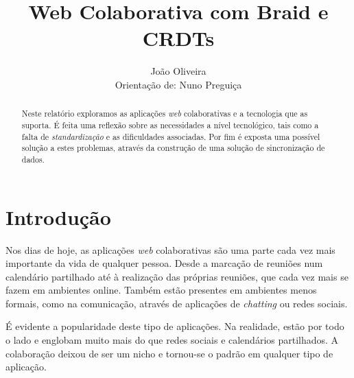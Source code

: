 \documentclass[runningheads]{llncs}
\begin{document}
%
    \title{Web Colaborativa com Braid e CRDTs} 
    \author{João Oliveira\\Orientação de: Nuno Preguiça}
    \maketitle              %
    \begin{abstract}
        Neste relatório exploramos as aplicações {\itshape web} colaborativas e
        a tecnologia que as suporta. É feita uma reflexão sobre as necessidades
        a nível tecnológico, tais como a falta de {\itshape standardização} e as
        dificuldades associadas. Por fim é exposta uma possível solução a estes
        problemas, através da construção de uma solução de sincronização de
        dados.

    \end{abstract}
    
    
    \section{Introdução}

        Nos dias de hoje, as aplicações {\itshape web} colaborativas são uma
        parte cada vez mais importante da vida de qualquer pessoa. Desde a
        marcação de reuniões num calendário partilhado até à realização das
        próprias reuniões, que cada vez mais se fazem em ambientes online.
        Também estão presentes em ambientes menos formais, como na comunicação,
        através de aplicações de {\itshape chatting} ou redes sociais.

        É evidente a popularidade deste tipo de aplicações. Na realidade, estão
        por todo o lado e englobam muito mais do que redes sociais e calendários
        partilhados. A colaboração deixou de ser um nicho e tornou-se o padrão
        em qualquer tipo de aplicação.
\end{document}
